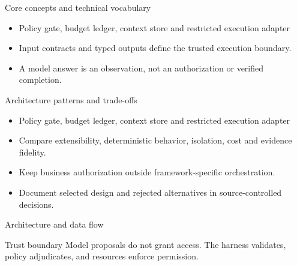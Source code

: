 \documentclass[aspectratio=169,10pt]{beamer}
\begin{document}
\begin{frame}{Core concepts and technical vocabulary}
\small
\begin{itemize}
\item Policy gate, budget ledger, context store and restricted execution adapter
\item Input contracts and typed outputs define the trusted execution boundary.
\item A model answer is an observation, not an authorization or verified completion.
\end{itemize}

\end{frame}

\begin{frame}{Architecture patterns and trade-offs}
\small
\begin{itemize}
\item Policy gate, budget ledger, context store and restricted execution adapter
\item Compare extensibility, deterministic behavior, isolation, cost and evidence fidelity.
\item Keep business authorization outside framework-specific orchestration.
\item Document selected design and rejected alternatives in source-controlled decisions.
\end{itemize}

\end{frame}

\begin{frame}{Architecture and data flow}
\small
\centering
{}
\vspace{0.6cm}
\begin{block}{Trust boundary}
Model proposals do not grant access. The harness validates, policy adjudicates, and resources enforce permission.
\end{block}
\end{frame}
\end{document}
